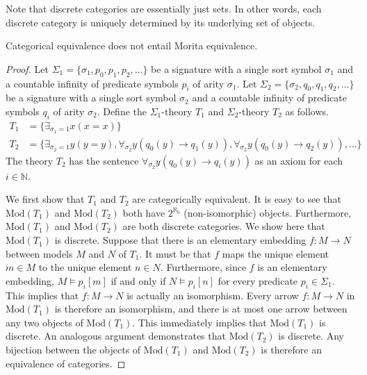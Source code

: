 Note that discrete categories are essentially just sets.  In other
words, each discrete category is uniquely determined by its underlying
set of objects.

\begin{thm} Categorical equivalence does not entail Morita
  equivalence.
\end{thm}

\begin{proof} Let $\Sigma_1=\{\sigma_1, p_0, p_1, p_2,\ldots\}$ be a
  signature with a single sort symbol $\sigma_1$ and a countable
  infinity of predicate symbols $p_i$ of arity $\sigma_1$. Let
  $\Sigma_2=\{\sigma_2, q_0, q_1, q_2,\ldots\}$ be a signature with a
  single sort symbol $\sigma_2$ and a countable infinity of predicate
  symbols $q_i$ of arity $\sigma_2$. Define the $\Sigma_1$-theory
  $T_1$ and $\Sigma_2$-theory $T_2$ as follows.
\begin{align*}
  T_1&=\{\exists_{\sigma_1=1} x (x=x)\}\\
  T_2&=\{\exists_{\sigma_2=1} y (y=y), \forall_{\sigma_2}y(q_0(y)\rightarrow q_1(y)), \forall_{\sigma_2}y(q_0(y)\rightarrow q_2(y)), \ldots\}
\end{align*}
The theory $T_2$ has the sentence
$\forall_{\sigma_2}y(q_0(y)\rightarrow q_i(y))$ as an axiom for each
$i\in\mathbb{N}$.

We first show that $T_1$ and $T_2$ are categorically equivalent. It is
easy to see that $\text{Mod}(T_1)$ and $\text{Mod}(T_2)$ both have
$2^{\aleph_0}$ (non-isomorphic) objects. Furthermore,
$\text{Mod}(T_1)$ and $\text{Mod}(T_2)$ are both discrete
categories. We show here that $\text{Mod}(T_1)$ is discrete. Suppose
that there is an elementary embedding $f:M\rightarrow N$ between
models $M$ and $N$ of $T_1$. It must be that $f$ maps the unique
element $m\in M$ to the unique element $n\in N$. Furthermore, since
$f$ is an elementary embedding, $M\vDash p_i[m]$ if and only if
$N\vDash p_i[n]$ for every predicate $p_i\in \Sigma_1$. This implies
that $f:M\rightarrow N$ is actually an isomorphism. Every arrow
$f:M\rightarrow N$ in $\text{Mod}(T_1)$ is therefore an isomorphism,
and there is at most one arrow between any two objects of
$\text{Mod}(T_1)$. This immediately implies that $\text{Mod}(T_1)$ is
discrete. An analogous argument demonstrates that $\text{Mod}(T_2)$ is
discrete. Any bijection between the objects of $\text{Mod}(T_1)$ and
$\text{Mod}(T_2)$ is therefore an equivalence of categories.


\end{proof}
